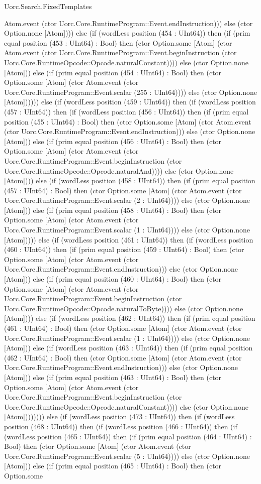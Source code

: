 \begin{lexlean}{Uorc.Search.FixedTemplates}
\begin{semanticmodule}
{Atom.event (ctor Uorc.Core.RuntimeProgram::Event.endInstruction))) else (ctor Option.none [Atom]))) else (if (wordLess position (454 : UInt64)) then (if (prim equal position (453 : UInt64) : Bool) then (ctor Option.some [Atom] (ctor Atom.event (ctor Uorc.Core.RuntimeProgram::Event.beginInstruction (ctor Uorc.Core.RuntimeOpcode::Opcode.naturalConstant)))) else (ctor Option.none [Atom])) else (if (prim equal position (454 : UInt64) : Bool) then (ctor Option.some [Atom] (ctor Atom.event (ctor Uorc.Core.RuntimeProgram::Event.scalar (255 : UInt64)))) else (ctor Option.none [Atom]))))) else (if (wordLess position (459 : UInt64)) then (if (wordLess position (457 : UInt64)) then (if (wordLess position (456 : UInt64)) then (if (prim equal position (455 : UInt64) : Bool) then (ctor Option.some [Atom] (ctor Atom.event (ctor Uorc.Core.RuntimeProgram::Event.endInstruction))) else (ctor Option.none [Atom])) else (if (prim equal position (456 : UInt64) : Bool) then (ctor Option.some [Atom] (ctor Atom.event (ctor Uorc.Core.RuntimeProgram::Event.beginInstruction (ctor Uorc.Core.RuntimeOpcode::Opcode.naturalAnd)))) else (ctor Option.none [Atom]))) else (if (wordLess position (458 : UInt64)) then (if (prim equal position (457 : UInt64) : Bool) then (ctor Option.some [Atom] (ctor Atom.event (ctor Uorc.Core.RuntimeProgram::Event.scalar (2 : UInt64)))) else (ctor Option.none [Atom])) else (if (prim equal position (458 : UInt64) : Bool) then (ctor Option.some [Atom] (ctor Atom.event (ctor Uorc.Core.RuntimeProgram::Event.scalar (1 : UInt64)))) else (ctor Option.none [Atom])))) else (if (wordLess position (461 : UInt64)) then (if (wordLess position (460 : UInt64)) then (if (prim equal position (459 : UInt64) : Bool) then (ctor Option.some [Atom] (ctor Atom.event (ctor Uorc.Core.RuntimeProgram::Event.endInstruction))) else (ctor Option.none [Atom])) else (if (prim equal position (460 : UInt64) : Bool) then (ctor Option.some [Atom] (ctor Atom.event (ctor Uorc.Core.RuntimeProgram::Event.beginInstruction (ctor Uorc.Core.RuntimeOpcode::Opcode.naturalToByte)))) else (ctor Option.none [Atom]))) else (if (wordLess position (462 : UInt64)) then (if (prim equal position (461 : UInt64) : Bool) then (ctor Option.some [Atom] (ctor Atom.event (ctor Uorc.Core.RuntimeProgram::Event.scalar (1 : UInt64)))) else (ctor Option.none [Atom])) else (if (wordLess position (463 : UInt64)) then (if (prim equal position (462 : UInt64) : Bool) then (ctor Option.some [Atom] (ctor Atom.event (ctor Uorc.Core.RuntimeProgram::Event.endInstruction))) else (ctor Option.none [Atom])) else (if (prim equal position (463 : UInt64) : Bool) then (ctor Option.some [Atom] (ctor Atom.event (ctor Uorc.Core.RuntimeProgram::Event.beginInstruction (ctor Uorc.Core.RuntimeOpcode::Opcode.naturalConstant)))) else (ctor Option.none [Atom]))))))) else (if (wordLess position (473 : UInt64)) then (if (wordLess position (468 : UInt64)) then (if (wordLess position (466 : UInt64)) then (if (wordLess position (465 : UInt64)) then (if (prim equal position (464 : UInt64) : Bool) then (ctor Option.some [Atom] (ctor Atom.event (ctor Uorc.Core.RuntimeProgram::Event.scalar (5 : UInt64)))) else (ctor Option.none [Atom])) else (if (prim equal position (465 : UInt64) : Bool) then (ctor Option.some }
\end{semanticmodule}
\end{lexlean}
